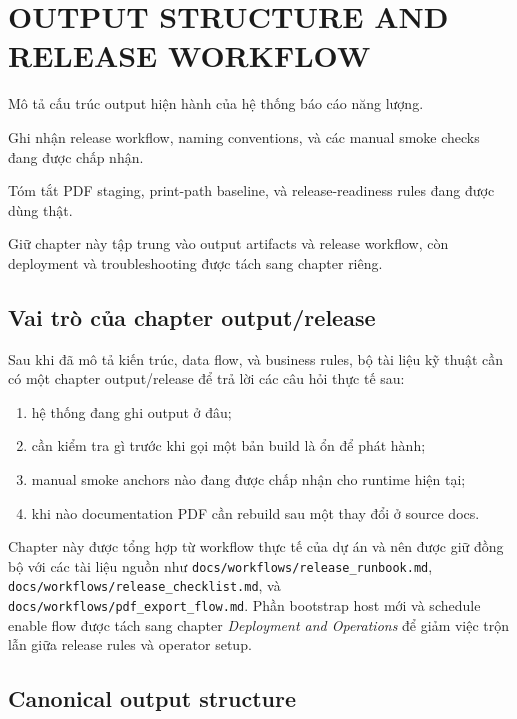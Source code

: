 \chapter{OUTPUT STRUCTURE AND RELEASE WORKFLOW}

\begin{ChapterObjectives}
\item Mô tả cấu trúc output hiện hành của hệ thống báo cáo năng lượng.
\item Ghi nhận release workflow, naming conventions, và các manual smoke checks đang được chấp nhận.
\item Tóm tắt PDF staging, print-path baseline, và release-readiness rules đang được dùng thật.
\item Giữ chapter này tập trung vào output artifacts và release workflow, còn deployment và troubleshooting được tách sang chapter riêng.
\end{ChapterObjectives}

\section{Vai trò của chapter output/release}

Sau khi đã mô tả kiến trúc, data flow, và business rules, bộ tài liệu kỹ thuật cần có một chapter output/release để trả lời các câu hỏi thực tế sau:

\begin{enumerate}[label=-]
\item hệ thống đang ghi output ở đâu;
\item cần kiểm tra gì trước khi gọi một bản build là ổn để phát hành;
\item manual smoke anchors nào đang được chấp nhận cho runtime hiện tại;
\item khi nào documentation PDF cần rebuild sau một thay đổi ở source docs.
\end{enumerate}

Chapter này được tổng hợp từ workflow thực tế của dự án và nên được giữ đồng bộ với các tài liệu nguồn như \texttt{docs/workflows/release\_runbook.md}, \texttt{docs/workflows/release\_checklist.md}, và \texttt{docs/workflows/pdf\_export\_flow.md}. Phần bootstrap host mới và schedule enable flow được tách sang chapter \textit{Deployment and Operations} để giảm việc trộn lẫn giữa release rules và operator setup.

\section{Canonical output structure}

